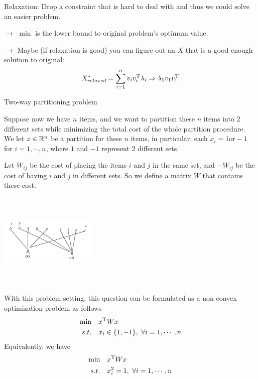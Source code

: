 Relaxation: Drop a constraint that is hard to deal with and thus we could solve an easier problem. 

$\rightarrow$ $\min$ is the lower bound to original problem's optimum value. 

$\rightarrow$ Maybe (if relaxation is good) you can figure out an $X$ that is a good enough solution to original:
\begin{equation*}
X^*_{relaxed} =\sum^n_{i=1}v_iv^{{\rm T}}_i\lambda_i \Rightarrow \lambda_1v_1 v^{{\rm T}}_1
\end{equation*}




\begin{example}{Two-way partitioning problem}
	
	Suppose now we have $n$ items, and we want to partition these $n$ items into 2 different sets while minimizing the total cost of the whole partition procedure. We let $x\in\mathbb{R}^n$ be a partition for these $n$ items, in particular, each $x_i=1 \text{or} -1$ for $i=1,\cdots, n$, where $1$ and $-1$ represent 2 different sets.
	
	Let $W_{ij}$ be the cost of placing the items $i$ and $j$ in the same set, and $-W_{ij}$ be the cost of having $i$ and $j$ in different sets. So we define a matrix $W$ that contains these cost.
	
	\begin{marginfigure}
	\centering
	\includegraphics[width=1.8in,height=1.8in]{figures/ch09/figure1120_1.png}
	\end{marginfigure}

With this problem setting, this question can be formulated as a non convex optimization problem as follows
\begin{align*}
\min \quad&x^{{\rm T}}Wx \\
s.t. \quad&x_i\in \{1,-1 \},\ \forall i=1,\cdots, n
\end{align*}
Equivalently, we have
\begin{align*}
\min \quad&x^{{\rm T}}Wx \\
s.t. \quad&x_i^2 = 1,\ \forall i = 1,\cdots,n
\end{align*}


\end{example}
